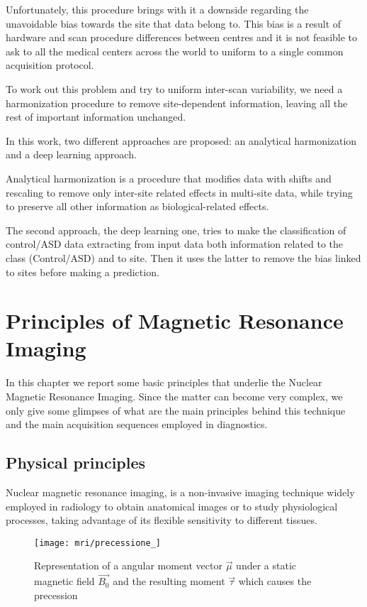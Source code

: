 \documentclass[11pt]{report}
\begin{document}
Unfortunately, this procedure brings with it a downside regarding the unavoidable bias towards the site that data belong to.
This bias is a result of hardware and scan procedure differences between centres and it is not feasible to ask to all the medical centers across the world to uniform to a single common acquisition protocol.

To work out this problem and try to uniform inter-scan variability, we need a harmonization procedure to remove site-dependent information, leaving all the rest of important information unchanged.

In this work, two different approaches are proposed: an analytical harmonization and a deep learning approach.

Analytical harmonization is a procedure that modifies data with shifts and rescaling to remove only inter-site related effects in multi-site data, while trying to preserve all other information as biological-related effects.

The second approach, the deep learning one, tries to make the classification of control/ASD data extracting from input data both information related to the class (Control/ASD) and to site.
Then it uses the latter to remove the bias linked to sites before making a prediction.


\chapter{Principles of Magnetic Resonance Imaging}\label{chap:mri_introduction}
 In this chapter we report some basic principles that underlie the Nuclear Magnetic Resonance Imaging.
 Since the matter can become very complex, we only give some glimpses of what are the main principles behind this technique and the main acquisition sequences employed in diagnostics.

\section{Physical principles}\label{sec:mri_introduction}
Nuclear magnetic resonance imaging, is a non-invasive imaging technique widely employed in radiology to obtain anatomical images or to study physiological processes, taking advantage of its flexible sensitivity to different tissues.

\begin{wrapfigure}[25]{l}{0.4\textwidth}
\centering
\texttt{[image: mri/precessione\_]}
\caption{Representation of a angular moment vector $\vec{\mu}$ under a static magnetic field $\vec{B_0}$ and the resulting moment $\vec{\tau}$  which causes the precession}
\end{wrapfigure}
\end{document}
